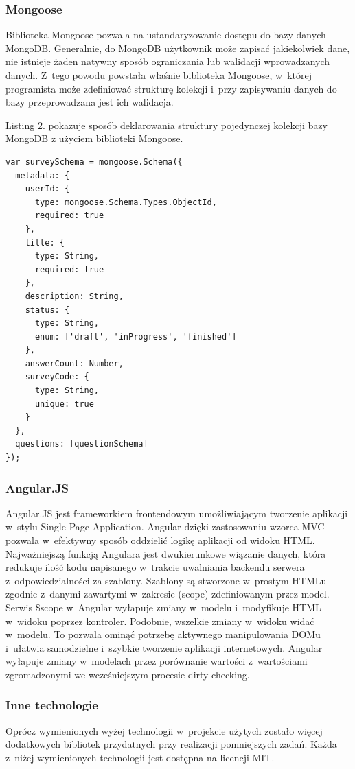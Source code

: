 \documentclass[12pt,a4paper,notitlepage]{article}
\begin{document}
\subsubsection{Mongoose}
Biblioteka Mongoose pozwala na ustandaryzowanie dostępu do bazy danych MongoDB. Generalnie, do MongoDB użytkownik może zapisać jakiekolwiek dane, nie istnieje żaden natywny sposób ograniczania lub walidacji wprowadzanych danych. Z~tego powodu powstała właśnie biblioteka Mongoose, w~której programista może zdefiniować strukturę kolekcji i~przy zapisywaniu danych do bazy przeprowadzana jest ich walidacja.
\par Listing 2. pokazuje sposób deklarowania struktury pojedynczej kolekcji bazy MongoDB z użyciem biblioteki Mongoose.

\begin{lstlisting}[caption=Przykład definicji struktury kolekcji w~bibliotece Mongoose ]
var surveySchema = mongoose.Schema({
  metadata: {
    userId: {
      type: mongoose.Schema.Types.ObjectId,
      required: true
    },
    title: {
      type: String,
      required: true
    },
    description: String,
    status: {
      type: String,
      enum: ['draft', 'inProgress', 'finished']
    },
    answerCount: Number,
    surveyCode: {
      type: String,
      unique: true
    }
  },
  questions: [questionSchema]
});
\end{lstlisting}

\subsubsection{Angular.JS}
Angular.JS jest frameworkiem frontendowym umożliwiającym tworzenie aplikacji w~stylu Single Page Application. Angular dzięki zastosowaniu wzorca MVC pozwala w~efektywny sposób oddzielić logikę aplikacji od widoku HTML. Najważniejszą funkcją Angulara jest dwukierunkowe wiązanie danych, która redukuje ilość kodu napisanego w~trakcie uwalniania backendu serwera z~odpowiedzialności za szablony. Szablony są stworzone w~prostym HTMLu zgodnie z~danymi zawartymi w~zakresie (scope) zdefiniowanym przez model. Serwis \$scope w~Angular wyłapuje zmiany w~modelu i~modyfikuje HTML w~widoku poprzez kontroler. Podobnie, wszelkie zmiany w~widoku widać w~modelu. To pozwala ominąć potrzebę aktywnego manipulowania DOMu i~ułatwia samodzielne i~szybkie tworzenie aplikacji internetowych. Angular wyłapuje zmiany w~modelach przez porównanie wartości z~wartościami zgromadzonymi we wcześniejszym procesie dirty-checking.

\subsubsection{Inne technologie}
Oprócz wymienionych wyżej technologii w~projekcie użytych zostało więcej dodatkowych bibliotek przydatnych przy realizacji pomniejszych zadań. Każda z~niżej wymienionych technologii jest dostępna na licencji MIT.
\end{document}
